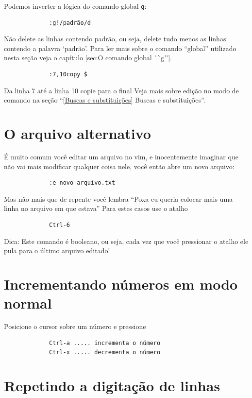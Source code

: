 \documentclass[10pt,a4paper,openany]{book}
\begin{document}
Podemos inverter a lógica do comando global \verb+g+:

\begin{verbatim}
			 :g!/padrão/d
\end{verbatim}


Não delete as linhas contendo padrão, ou seja, delete tudo menos as linhas
contendo a palavra `padrão'. Para ler mais sobre o comando ``global'' utilizado 
nesta seção veja o capítulo \ref{sec:O comando global ``g''}.

\begin{verbatim}
			 :7,10copy $
\end{verbatim}

Da linha 7 até a linha 10 copie para o final
Veja mais sobre edição no modo de comando na seção ``\ref{Buscas e
substituições} Buscas e substituições''.

\section{O arquivo alternativo}
\label{O arquivo alternativo}

É muito comum você editar um arquivo no vim, e inocentemente imaginar
que não vai mais modificar qualquer coisa nele, você então abre um
novo arquivo:

\begin{verbatim}
			 :e novo-arquivo.txt
\end{verbatim}

Mas não mais que de repente você lembra ``Poxa eu queria colocar mais
uma linha no arquivo em que estava'' Para estes casos use o atalho

\begin{verbatim}
			 Ctrl-6
\end{verbatim}

Dica: Este comando é booleano, ou seja, cada vez que você pressionar o atalho
ele pula para o último arquivo editado!


\section{Incrementando números em modo normal}\label{Incrementando números em modo normal}
Posicione o cursor sobre um número e pressione

\begin{verbatim}
			 Ctrl-a ..... incrementa o número
			 Ctrl-x ..... decrementa o número
\end{verbatim}

\section{Repetindo a digitação de linhas}
\label{Repetindo a digitação de linhas}
\end{document}
